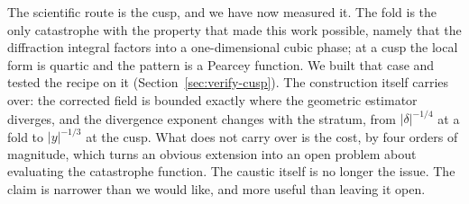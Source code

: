 The scientific route is the cusp, and we have now measured it. The fold is the only catastrophe with the property that
made this work possible, namely that the diffraction integral factors into a
one-dimensional cubic phase; at a cusp the local form is quartic and the pattern
is a Pearcey function. We built that case and tested the recipe on it
(Section~\ref{sec:verify-cusp}). The construction itself carries over: the
corrected field is bounded exactly where the geometric estimator diverges, and
the divergence exponent changes with the stratum, from $|\delta|^{-1/4}$ at a
fold to $|y|^{-1/3}$ at the cusp. What does not carry over is the cost, by four
orders of magnitude, which turns an obvious extension into an open problem about evaluating the catastrophe function. The caustic itself is no longer the issue. The claim is narrower
than we would like, and more useful than leaving it open.
